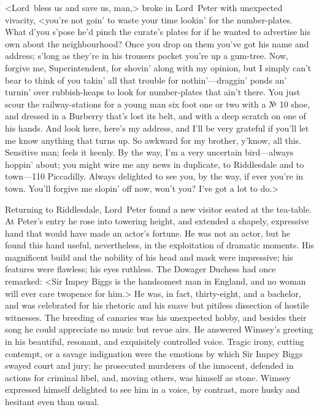 <Lord~bless us and save us, man,> broke in Lord~Peter with unexpected vivacity, <you're not goin' to waste your time lookin' for the number-plates. What d'you s'pose he'd pinch the curate's plates for if he wanted to advertise his own about the neighbourhood? Once you drop on them you've got his name and address; s'long as they're in his trousers pocket you're up a gum-tree. Now, forgive me, Superintendent, for shovin' along with my opinion, but I simply can't bear to think of you takin' all that trouble for nothin'—draggin' ponds an' turnin' over rubbish-heaps to look for number-plates that ain't there. You just scour the railway-stations for a young man six foot one or two with a № 10 shoe, and dressed in a Burberry that's lost its belt, and with a deep scratch on one of his hands. And look here, here's my address, and I'll be very grateful if you'll let me know anything that turns up. So awkward for my brother, y'know, all this. Sensitive man; feels it keenly. By the way, I'm a very uncertain bird—always hoppin' about; you might wire me any news in duplicate, to Riddlesdale and to town—110 Piccadilly. Always delighted to see you, by the way, if ever you're in town. You'll forgive me slopin' off now, won't you? I've got a lot to do.>

\divider

Returning to Riddlesdale, Lord~Peter found a new visitor seated at the tea-table. At Peter's entry he rose into towering height, and extended a shapely, expressive hand that would have made an actor's fortune.  He was not an actor, but he found this hand useful, nevertheless, in the exploitation of dramatic moments. His magnificent build and the nobility of his head and mask were impressive; his features were flawless; his eyes ruthless. The Dowager Duchess had once remarked: <Sir Impey Biggs is the handsomest man in England, and no woman will ever care twopence for him.> He was, in fact, thirty-eight, and a bachelor, and was celebrated for his rhetoric and his suave but pitiless dissection of hostile witnesses. The breeding of canaries was his unexpected hobby, and besides their song he could appreciate no music but revue airs. He answered Wimsey's greeting in his beautiful, resonant, and exquisitely controlled voice. Tragic irony, cutting contempt, or a savage indignation were the emotions by which Sir Impey Biggs swayed court and jury; he prosecuted murderers of the innocent, defended in actions for criminal libel, and, moving others, was himself as stone. Wimsey expressed himself delighted to see him in a voice, by contrast, more husky and hesitant even than usual.

